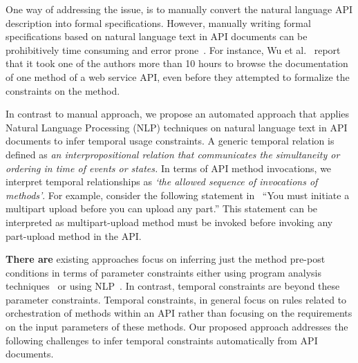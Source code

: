 One way of addressing the issue, is to manually convert the natural language API description into formal specifications. 
However, manually writing formal specifications based on natural language text in API documents can be prohibitively time consuming and error prone~\cite{wu2013inferring,RubingerWEB10}. 
For instance, Wu et al.~\cite{wu2013inferring} report that it took one of the authors more than 10 hours to browse the documentation of one method of a web service API, even before they attempted to formalize the constraints on the method.

In contrast to manual approach, we propose an automated approach that applies Natural Language Processing (NLP) techniques on natural language text in API documents to infer temporal usage constraints. 
A generic temporal relation is defined as \textit{an interpropositional relation that communicates the simultaneity or ordering in time of events or states.}
In terms of API method invocations, we interpret temporal relationships as \textit{`the allowed sequence of invocations of methods'}.
For example, consider the following statement in \amazonAPI\ ``You must initiate a multipart upload before you can upload any part.''
This statement can be interpreted as multipart-upload method must be invoked before invoking any part-upload method in the API.




\textbf{There are} existing approaches focus on inferring just the method pre-post conditions in terms of parameter constraints either using program analysis techniques~\cite{Henkel07discoveringdocumentation,Ghezzi:2009:SIB:1555001.1555057,Henkel:2008:DDA:1363102.1363105,Flanagan:2001:HAA:647540.730008,Buse:2008:ADI:1390630.1390664} or using NLP~\cite{pandita12:inferring, wu2013inferring}. 
In contrast, temporal constraints are beyond these parameter constraints.
Temporal constraints, in general focus on rules related to orchestration of methods within an API rather than focusing on the requirements on the input parameters of these methods. Our proposed approach addresses the following challenges to infer temporal constraints automatically from API documents.   

